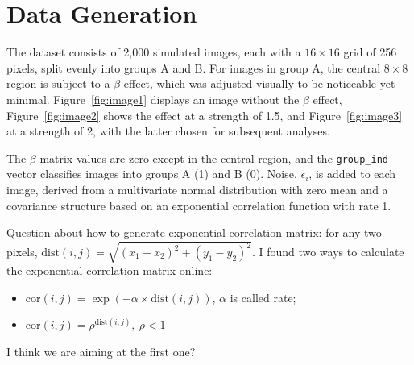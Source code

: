 \documentclass[12pt]{article}
\begin{document}
\section*{Data Generation}

The dataset consists of 2,000 simulated images, each with a \(16 \times 16\) grid of 256 pixels, split evenly into groups A and B. For images in group A, the central \(8 \times 8\) region is subject to a \(\beta\) effect, which was adjusted visually to be noticeable yet minimal. Figure~\ref{fig:image1} displays an image without the \(\beta\) effect, Figure~\ref{fig:image2} shows the effect at a strength of 1.5, and Figure~\ref{fig:image3} at a strength of 2, with the latter chosen for subsequent analyses.

The \(\beta\) matrix values are zero except in the central region, and the \texttt{group\_ind} vector classifies images into groups A (1) and B (0). Noise, \(\epsilon_i\), is added to each image, derived from a multivariate normal distribution with zero mean and a covariance structure based on an exponential correlation function with rate 1.

Question about how to generate exponential correlation matrix: for any two pixels, \(\text{dist}(i, j) = \sqrt{(x_1 - x_2)^2 + (y_1 - y_2)^2}\). I found two ways to calculate the exponential correlation matrix online:
\begin{itemize}
    \item \(\text{cor}(i, j) = \exp(-\alpha \times \text{dist}(i, j))\), \(\alpha\) is called rate;
    \item \(\text{cor}(i, j) = \rho^{\text{dist}(i, j)}, \ \rho < 1\)
\end{itemize}
I think we are aiming at the first one?

\end{document}
